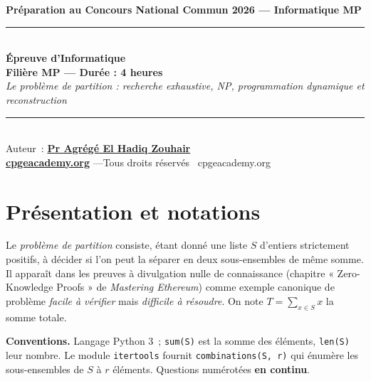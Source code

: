 \documentclass[11pt,a4paper]{article}
\newcommand{\code}[1]{\lstinline!#1!}
\begin{document}
\begin{center}
{\large\bfseries Préparation au Concours National Commun 2026 --- Informatique MP}\\[8pt]
\rule{0.9\linewidth}{0.5pt}\\[6pt]
{\Large\bfseries Épreuve d'Informatique}\\[4pt]
{\bfseries Filière MP --- Durée : 4 heures}\\[6pt]
{\itshape Le problème de partition : recherche exhaustive, NP, programmation dynamique et reconstruction}\\[6pt]
\rule{0.9\linewidth}{0.5pt}\\[8pt]
{\small Auteur~: \href{https://orcid.org/0000-0002-6108-7176}{\textbf{Pr Agrégé El Hadiq Zouhair}}}\\[3pt]
{\small \href{https://cpgeacademy.org}{\textbf{cpgeacademy.org}} \quad---\quad Tous droits réservés \textcopyright\ cpgeacademy.org}
\end{center}
\medskip
\begin{center}
\end{center}

\bigskip
\section*{Présentation et notations}

Le \emph{problème de partition} consiste, étant donné une liste $S$ d'entiers strictement
positifs, à décider si l'on peut la séparer en deux sous-ensembles de même somme. Il apparaît dans
les preuves à divulgation nulle de connaissance (chapitre « Zero-Knowledge Proofs » de
\emph{Mastering Ethereum}) comme exemple canonique de problème \emph{facile à vérifier} mais
\emph{difficile à résoudre}. On note $T = \sum_{x\in S} x$ la somme totale.

\noindent\textbf{Conventions.} Langage Python 3~; \code{sum(S)} est la somme des éléments,
\code{len(S)} leur nombre. Le module \code{itertools} fournit \code{combinations(S, r)} qui énumère
les sous-ensembles de $S$ à $r$ éléments. Questions numérotées \textbf{en continu}.
\end{document}
